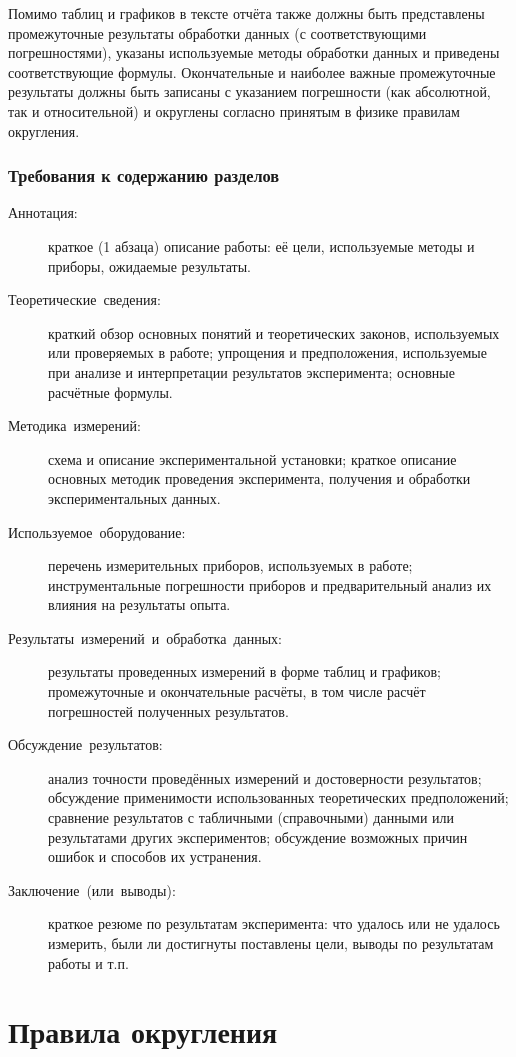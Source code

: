Помимо таблиц и графиков в тексте отчёта также должны быть представлены
промежуточные результаты обработки данных (с соответствующими погрешностями),
указаны используемые методы обработки данных и приведены соответствующие
формулы. Окончательные и наиболее важные промежуточные результаты
должны быть записаны с указанием погрешности (как абсолютной, так
и относительной) и округлены согласно принятым в физике правилам округления.

\subsubsection*{Требования к содержанию разделов}
\begin{description}
\item [{Аннотация:}] краткое (1 абзаца) описание работы: её
цели, используемые методы и приборы, ожидаемые результаты.
\item [{Теоретические~сведения:}] краткий обзор основных понятий и теоретических
законов, используемых или проверяемых в работе; упрощения и предположения,
используемые при анализе и интерпретации результатов эксперимента;
основные расчётные формулы.
\item [{Методика~измерений:}] схема и описание экспериментальной установки;
краткое описание основных методик проведения эксперимента, получения
и обработки экспериментальных данных.
\item [{Используемое~оборудование:}] перечень измерительных приборов,
используемых в работе; инструментальные погрешности приборов и предварительный
анализ их влияния на результаты опыта.
\item [{Результаты~измерений~и~обработка~данных:}] результаты проведенных
измерений в форме таблиц и графиков; промежуточные и окончательные
расчёты, в том числе расчёт погрешностей полученных результатов.
\item [{Обсуждение~результатов:}] анализ точности проведённых измерений
и достоверности результатов; обсуждение применимости использованных
теоретических предположений; сравнение результатов с табличными (справочными)
данными или результатами других экспериментов; обсуждение возможных
причин ошибок и способов их устранения.
\item [{Заключение~(или~выводы):}] краткое резюме по результатам эксперимента:
что удалось или не удалось измерить, были ли достигнуты поставлены
цели, выводы по результатам работы и т.п.
\end{description}

\section{Правила округления\label{subsec:round}}


